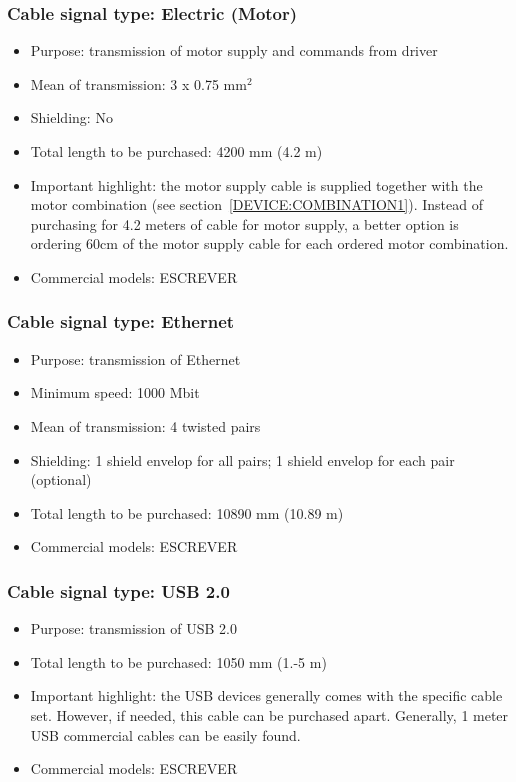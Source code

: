 \subsubsection{Cable signal type: Electric (Motor)} \label{CABLETYPE:Electric(Motor)}
\begin{itemize}
  \item Purpose: transmission of motor supply and commands from driver
  \item Mean of transmission: 3 x 0.75 mm$^{2}$
  \item Shielding: No
  \item Total length to be purchased: 4200 mm (4.2 m)
  \item Important highlight: the motor supply cable is supplied together with the motor combination (see section~\ref{DEVICE:COMBINATION1}). Instead of purchasing for 4.2 meters of cable for motor supply, a better option is ordering 60cm of the motor supply cable for each ordered motor combination.
  \item Commercial models: ESCREVER
\end{itemize}
\subsubsection{Cable signal type: Ethernet} \label{CABLETYPE:Ethernet}
\begin{itemize}
  \item Purpose: transmission of Ethernet
  \item Minimum speed: 1000 Mbit
  \item Mean of transmission: 4 twisted pairs
  \item Shielding: 1 shield envelop for all pairs; 1 shield envelop for each pair (optional)
  \item Total length to be purchased: 10890 mm (10.89 m)
  \item Commercial models: ESCREVER
\end{itemize}
\subsubsection{Cable signal type: USB 2.0} \label{CABLETYPE:USB20}
\begin{itemize}
  \item Purpose: transmission of USB 2.0
  \item Total length to be purchased: 1050 mm (1.-5 m)
  \item Important highlight: the USB devices generally comes with the specific cable set. However, if needed, this cable can be purchased apart. Generally, 1 meter USB commercial cables can be easily found.
  \item Commercial models: ESCREVER
\end{itemize}
